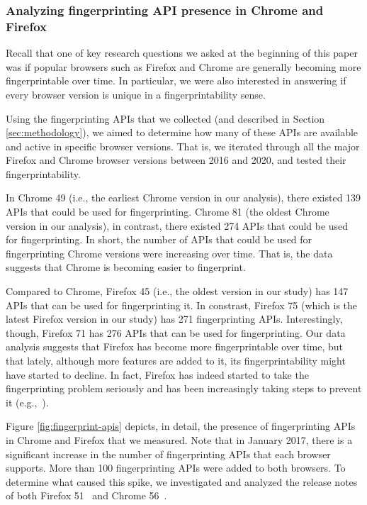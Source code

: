 \subsubsection{Analyzing fingerprinting API presence in Chrome and
  Firefox}

Recall that one of key research questions we asked at the beginning of
this paper was if popular browsers such as Firefox and Chrome are
generally becoming more fingerprintable over time. In particular, we
were also interested in answering if every browser version is unique
in a fingerprintability sense.

Using the fingerprinting APIs that we collected (and described in
Section \ref{sec:methodology}), we aimed to determine how many of
these APIs are available and active in specific browser versions. That
is, we iterated through all the major Firefox and Chrome browser
versions between 2016 and 2020, and tested their fingerprintability.

In Chrome 49 (i.e., the earliest Chrome version in our analysis),
there existed 139 APIs that could be used for fingerprinting. Chrome
81 (the oldest Chrome version in our analysis), in contrast, there
existed 274 APIs that could be used for fingerprinting. In short, the
number of APIs that could be used for fingerprinting Chrome versions
were increasing over time. That is, the data suggests that Chrome is
becoming easier to fingerprint.

Compared to Chrome, Firefox 45 (i.e., the oldest version in our study)
has 147 APIs that can be used for fingerprinting it. In constrast,
Firefox 75 (which is the latest Firefox version in our study) has 271
fingerprinting APIs. Interestingly, though, Firefox 71 has 276 APIs
that can be used for fingerprinting. Our data analysis suggests that
Firefox has become more fingerprintable over time, but that lately,
although more features are added to it, its fingerprintability might
have started to decline. In fact, Firefox has indeed started to take
the fingerprinting problem seriously and has been increasingly taking
steps to prevent it (e.g.,~\cite{FirefoxFingerprinting}).

Figure \ref{fig:fingerprint-apis} depicts, in detail, the presence of
fingerprinting APIs in Chrome and Firefox that we measured. Note that
in January 2017, there is a significant increase in the number of
fingerprinting APIs that each browser supports. More than 100
fingerprinting APIs were added to both browsers. To determine what
caused this spike, we investigated and analyzed the release notes of
both Firefox 51~\cite{firefox-51-notes} and Chrome
56~\cite{chrome-56-notes}.

